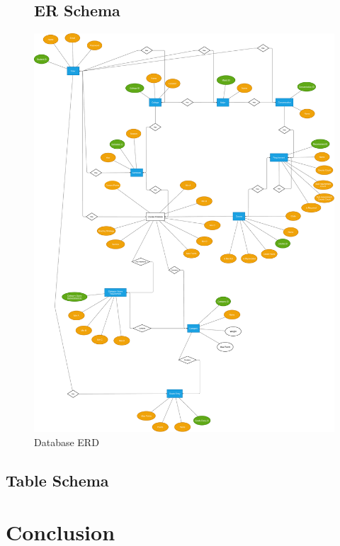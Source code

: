 \documentclass[12pt]{article}
\begin{document}
\begin{figure}[p!]
  \subsection{ER Schema}
  \centering
  \includegraphics[width=\linewidth]{database_erd.pdf}
  \caption{Database ERD}
\end{figure}

\clearpage

\subsection{Table Schema}

\section{Conclusion}
\end{document}
